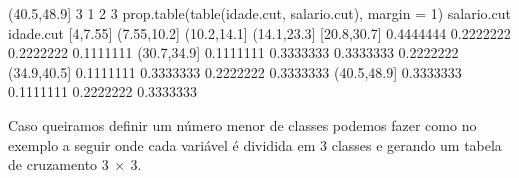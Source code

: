 \documentclass[
  10pt,
  a4paper]{book}
\newenvironment{Shaded}{\begin{snugshade}}{\end{snugshade}}
\newcommand{\AttributeTok}[1]{\textcolor[rgb]{0.77,0.63,0.00}{#1}}
\newcommand{\DecValTok}[1]{\textcolor[rgb]{0.00,0.00,0.81}{#1}}
\newcommand{\FloatTok}[1]{\textcolor[rgb]{0.00,0.00,0.81}{#1}}
\newcommand{\FunctionTok}[1]{\textcolor[rgb]{0.00,0.00,0.00}{#1}}
\newcommand{\NormalTok}[1]{#1}
\begin{document}
\begin{Shaded}
\begin{Highlighting}[]
\NormalTok{  (}\FloatTok{40.5}\NormalTok{,}\FloatTok{48.9}\NormalTok{]        }\DecValTok{3}           \DecValTok{1}           \DecValTok{2}           \DecValTok{3}
\FunctionTok{prop.table}\NormalTok{(}\FunctionTok{table}\NormalTok{(idade.cut, salario.cut), }\AttributeTok{margin =} \DecValTok{1}\NormalTok{)}
\NormalTok{             salario.cut}
\NormalTok{idade.cut      [}\DecValTok{4}\NormalTok{,}\FloatTok{7.55}\NormalTok{] (}\FloatTok{7.55}\NormalTok{,}\FloatTok{10.2}\NormalTok{] (}\FloatTok{10.2}\NormalTok{,}\FloatTok{14.1}\NormalTok{] (}\FloatTok{14.1}\NormalTok{,}\FloatTok{23.3}\NormalTok{]}
\NormalTok{  [}\FloatTok{20.8}\NormalTok{,}\FloatTok{30.7}\NormalTok{] }\FloatTok{0.4444444}   \FloatTok{0.2222222}   \FloatTok{0.2222222}   \FloatTok{0.1111111}
\NormalTok{  (}\FloatTok{30.7}\NormalTok{,}\FloatTok{34.9}\NormalTok{] }\FloatTok{0.1111111}   \FloatTok{0.3333333}   \FloatTok{0.3333333}   \FloatTok{0.2222222}
\NormalTok{  (}\FloatTok{34.9}\NormalTok{,}\FloatTok{40.5}\NormalTok{] }\FloatTok{0.1111111}   \FloatTok{0.3333333}   \FloatTok{0.2222222}   \FloatTok{0.3333333}
\NormalTok{  (}\FloatTok{40.5}\NormalTok{,}\FloatTok{48.9}\NormalTok{] }\FloatTok{0.3333333}   \FloatTok{0.1111111}   \FloatTok{0.2222222}   \FloatTok{0.3333333}
\end{Highlighting}
\end{Shaded}

Caso queiramos definir um número menor de classes podemos fazer como no
exemplo a seguir onde cada variável é dividida em 3 classes e gerando um
tabela de cruzamento \(3~\times~3\).
\end{document}
